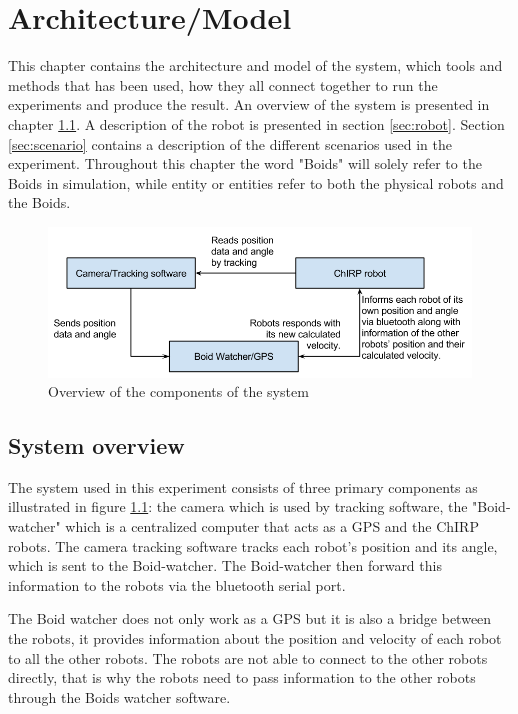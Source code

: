 \chapter{Architecture/Model}
\label{cha:architectureAndModel}
This chapter contains the architecture and model of the system, which tools and methods that has been used, how they all connect together to run the experiments and produce the result.
An overview of the system is presented in chapter \ref{sec:overview}. A description of the robot is presented in section \ref{sec:robot}. Section \ref{sec:scenario} contains a description of the different scenarios used in the experiment. Throughout this chapter the word "Boids" will solely refer to the Boids in simulation, while entity or entities refer to both the physical robots and the Boids.

\begin{figure}[h]
\begin{center}
\includegraphics[width=\linewidth]{figs/system_overview}
\end{center}
\caption[System overview]{Overview of the components of the system}
\label{fig:overview}
\end{figure}

\section{System overview}
\label{sec:overview}

The system used in this experiment consists of three primary components as illustrated in figure \ref{fig:overview}: the camera which is used by tracking software, the "Boid-watcher" which is a centralized computer that acts as a GPS and the ChIRP robots.
The camera tracking software tracks each robot's position and its angle, which is sent to the Boid-watcher. The Boid-watcher then forward this information to the robots via the bluetooth serial port.

The Boid watcher does not only work as a GPS but it is also a bridge between the robots, it provides information about the position and velocity of each robot to all the other robots. The robots are not able to connect to the other robots directly, that is why the robots need to pass information to the other robots through the Boids watcher software.

